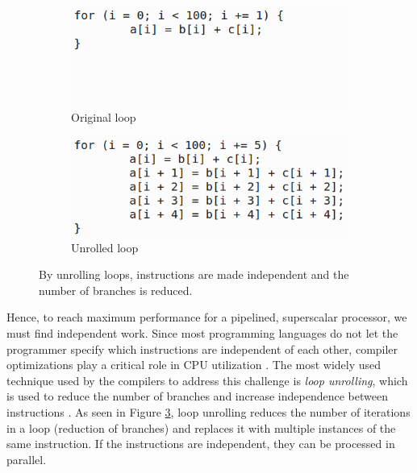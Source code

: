 \begin{figure}
  \centering
  \begin{subfigure}{0.45\textwidth}
    \includegraphics[width=\textwidth]{img/loop-unrolling-1.png}
    \caption{Original loop}
    \label{fig:loop-unrolling-1} 
  \end{subfigure}
  \begin{subfigure}{0.45\textwidth}
    \includegraphics[width=\textwidth]{img/loop-unrolling-2.png}
    \caption{Unrolled loop}
    \label{fig:loop-unrolling-2} 
  \end{subfigure}
  \caption{By unrolling loops, instructions are made independent and the number of branches is reduced.}
  \label{fig:loop-unrolling} 
\end{figure}
Hence, to reach maximum performance for a pipelined, superscalar processor, we must find independent work. Since most programming languages do not let the programmer specify which instructions are independent of each other, compiler optimizations play a critical role in CPU utilization \cite{Boncz2005-wj}. The most widely used technique used by the compilers to address this challenge is \textit{loop unrolling}, which is used to reduce the number of branches and increase independence between instructions \cite{Wikipedia_contributors2015-zc}. As seen in Figure \ref{fig:loop-unrolling}, loop unrolling reduces the number of iterations in a loop (reduction of branches) and replaces it with multiple instances of the same instruction. If the instructions are independent, they can be processed in parallel.

